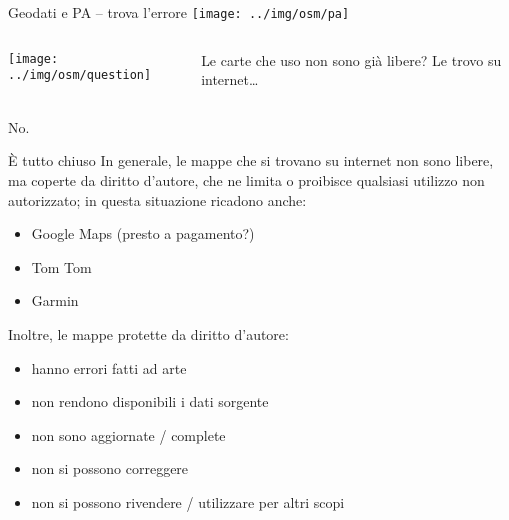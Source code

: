 \documentclass[xcolor=svgnames]{beamer}
\begin{document}
	
	\begin{frame}{Geodati e PA -- \small{trova l'errore}}
		\centering\texttt{[image: ../img/osm/pa]}\\
	\end{frame}


	\begin{frame}
		\begin{columns}[c]
				\begin{center}
					\texttt{[image: ../img/osm/question]}
				\end{center}
				\huge Le carte che uso non sono già libere? Le trovo su internet\ldots
		\end{columns}
	\end{frame}


	\begin{frame}
		\begin{center}
			\fontsize{50}{60}\selectfont No.
		\end{center}
	\end{frame}


	\begin{frame}{È tutto chiuso}
		In generale, le mappe che si trovano su internet non sono libere, ma coperte da diritto d'autore, che ne limita o proibisce qualsiasi utilizzo non autorizzato; in questa situazione ricadono anche:

		\begin{itemize}
			\item Google Maps \footnotesize{(presto a pagamento?)}
			\item Tom Tom
			\item Garmin
		\end{itemize}

		Inoltre, le mappe protette da diritto d'autore:

		\begin{itemize}
			\item hanno errori fatti ad arte
			\item non rendono disponibili i dati sorgente
			\item non sono aggiornate / complete
			\item non si possono correggere
			\item non si possono rivendere / utilizzare per altri scopi
		\end{itemize}
	\end{frame}
\end{document}
